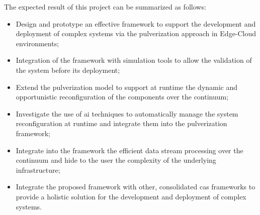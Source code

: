 \documentclass[12pt,a4paper]{article}
\begin{document}
The expected result of this project can be summarized as follows:

\begin{itemize}
	\item Design and prototype an effective framework to support the development and deployment of complex systems
		via the pulverization approach in Edge-Cloud environments;
	\item Integration of the framework with simulation tools to allow the validation of the system before its deployment;
	\item Extend the pulverization model to support at runtime the dynamic and opportunistic reconfiguration of the components over the continuum;
	\item Investigate the use of \ac{ai} techniques to automatically manage the system reconfiguration at runtime and integrate them into the pulverization framework;
	\item Integrate into the framework the efficient data stream processing over the continuum and hide to the user the complexity of the underlying infrastructure;
	\item Integrate the proposed framework with other, consolidated \ac{cas} frameworks
		to provide a holistic solution for the development and deployment of complex systems.
\end{itemize}


\end{document}
